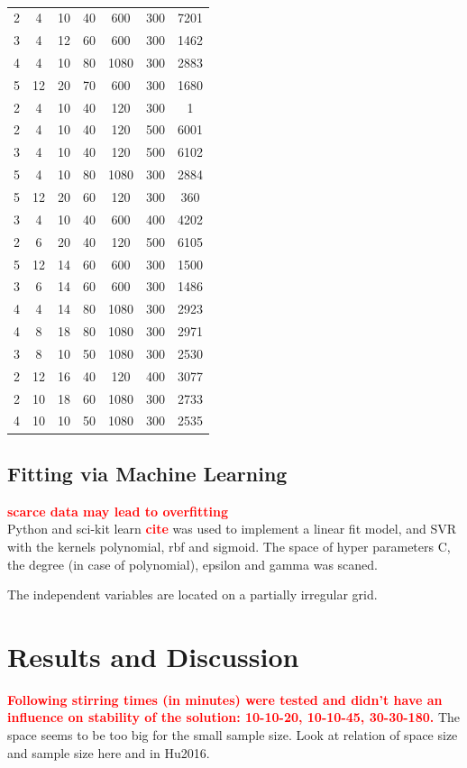 \documentclass[a4paper]{article}
\newcommand{\todo}[1]{\textbf{\textcolor{red}{#1}}}
\newcommand{\td}[1]{\textbf{\textcolor{red}{#1}}}
\begin{document}
\begin{table}[htb]
\begin{tabular}{ccccccc}
2	&4	&10	&40	&600	&300	&7201	\\
3	&4	&12	&60	&600	&300	&1462	\\
4	&4	&10	&80	&1080	&300	&2883	\\
5	&12	&20	&70	&600	&300	&1680	\\
		\hline
2	&4	&10	&40	&120	&300	&1	\\
2	&4	&10	&40	&120	&500	&6001	\\
3	&4	&10	&40	&120	&500	&6102	\\
5	&4	&10	&80	&1080	&300	&2884	\\
5	&12	&20	&60	&120	&300	&360	\\
		\hline
3	&4	&10	&40	&600	&400	&4202	\\
2	&6	&20	&40	&120	&500	&6105	\\
5	&12	&14	&60	&600	&300	&1500	\\
3	&6	&14	&60	&600	&300	&1486	\\
4	&4	&14	&80	&1080	&300	&2923	\\
		\hline
4	&8	&18	&80	&1080	&300	&2971	\\
3	&8	&10	&50	&1080	&300	&2530	\\
2	&12	&16	&40	&120	&400	&3077	\\
2	&10	&18	&60	&1080	&300	&2733	\\
4	&10	&10	&50	&1080	&300	&2535	\\
		\hline
		\hline
	\end{tabular}
	\caption{}
	\label{tab:emma}
\end{table}



\subsection{Fitting via Machine Learning}
\td{scarce data may lead to overfitting\cite{Lecun1995conv}}\\
Python and sci-kit learn \td{cite} was used to implement a linear fit model, and SVR with the kernels polynomial, rbf and sigmoid. 
The space of hyper parameters C, the degree (in case of polynomial), epsilon and gamma was scaned. 

The independent variables are located on a partially irregular grid.  


\clearpage
\section{Results and Discussion}
\todo{Following stirring times (in minutes) were tested and didn't have an influence on stability of the solution: 10-10-20, 10-10-45, 30-30-180.}
The space seems to be too big for the small sample size.
Look at relation of space size and sample size here and in Hu2016.
\end{document}
